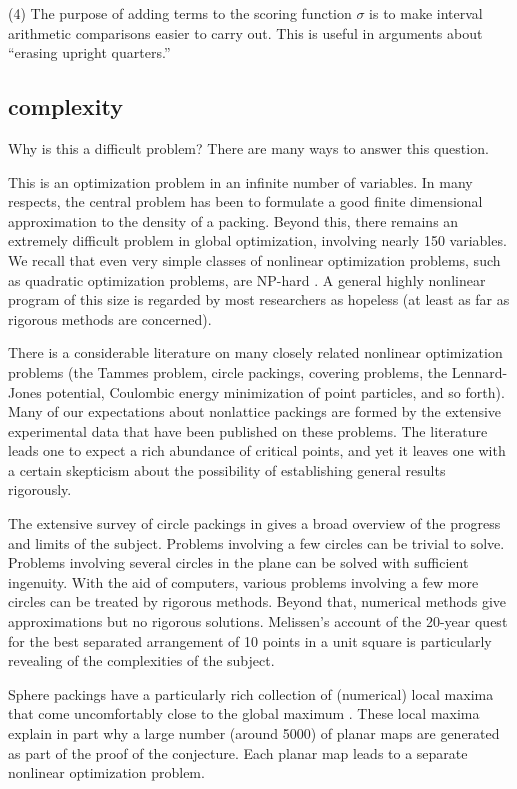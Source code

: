 (4) The purpose of adding terms to the scoring function $\sigma$
is to make
interval arithmetic comparisons
easier to carry out.  This is useful in arguments about ``erasing
upright quarters.''



\subsection{complexity}

Why is this a difficult problem?  There are many ways to answer this
question.

This is an optimization problem in an infinite number of
variables.  In many respects, the central problem has been to
formulate a good finite dimensional approximation to the density
of a packing.  Beyond this, there remains an extremely difficult
problem in global optimization, involving nearly 150 variables.
We recall that even very simple classes of nonlinear optimization
problems, such as quadratic optimization problems, are NP-hard
\cite{HoPT95}.  A general highly nonlinear program of this size is
regarded by most researchers as hopeless (at least as far as
rigorous methods are concerned).

There is a considerable literature on many closely related nonlinear
optimization problems (the Tammes problem, circle packings, covering
problems, the Lennard-Jones potential, Coulombic energy minimization
of point particles, and so forth). Many of our expectations about
nonlattice packings are formed by the extensive experimental data
that have been published on these problems. The literature leads one
to expect a rich abundance of critical points, and yet it leaves one
with a certain skepticism about the possibility of establishing
general results rigorously.

The extensive survey of circle packings
in \cite{Mel97} gives a broad overview of the progress and limits
of the subject.
Problems involving a few circles can be
trivial to solve.
Problems involving several circles in the plane can be solved with
sufficient ingenuity.
With the aid of computers, various  problems involving
a few more circles can be
treated by rigorous methods.
Beyond that, numerical methods
give approximations but no rigorous solutions.
Melissen's account of
the 20-year quest for the best separated arrangement of 10
points in a unit square is particularly revealing of the complexities
of the subject.

Sphere packings have a particularly rich collection of (numerical)
local maxima that come uncomfortably close to the global maximum
\cite{spp}. These local maxima explain in part why a large number
(around 5000) of planar maps are generated as part of the proof of
the conjecture.  Each planar map leads to a separate nonlinear
optimization problem.








